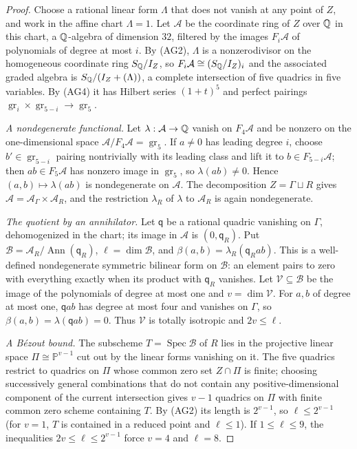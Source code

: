 \begin{proof}
Choose a rational linear form $\Lambda$ that does not vanish at any point of
$Z$, and work in the affine chart $\Lambda=1$. Let $\mathcal A$ be the
coordinate ring of $Z$ over $\mathbb Q$ in this chart, a $\mathbb Q$-algebra of dimension
$32$, filtered by the images $F_i\mathcal A$ of polynomials of degree at most
$i$. By (AG2), $\Lambda$ is a nonzerodivisor on the homogeneous coordinate ring
$S_\mathbb Q/I_Z$, so $F_i\mathcal A\cong(S_\mathbb Q/I_Z)_i$ and the associated graded algebra
is $S_\mathbb Q/(I_Z+(\Lambda))$, a complete intersection of five quadrics in five
variables. By (AG4) it has Hilbert series $(1+t)^5$ and perfect pairings
$\operatorname{gr}_i\times\operatorname{gr}_{5-i}\to\operatorname{gr}_5$.

\emph{A nondegenerate functional.} Let $\lambda:\mathcal A\to\mathbb Q$ vanish on
$F_4\mathcal A$ and be nonzero on the one-dimensional space
$\mathcal A/F_4\mathcal A=\operatorname{gr}_5$. If $a\ne0$ has leading degree
$i$, choose $b'\in\operatorname{gr}_{5-i}$ pairing nontrivially with its leading
class and lift it to $b\in F_{5-i}\mathcal A$; then $ab\in F_5\mathcal A$ has
nonzero image in $\operatorname{gr}_5$, so $\lambda(ab)\ne0$. Hence
$(a,b)\mapsto\lambda(ab)$ is nondegenerate on $\mathcal A$. The decomposition
$Z=\Gamma\sqcup R$ gives $\mathcal A=\mathcal A_\Gamma\times\mathcal A_R$, and
the restriction $\lambda_R$ of $\lambda$ to $\mathcal A_R$ is again
nondegenerate.

\emph{The quotient by an annihilator.} Let $\mathsf q$ be a rational quadric
vanishing on $\Gamma$, dehomogenized in the chart; its image in $\mathcal A$ is
$(0,\mathsf q_R)$. Put $\mathcal B=\mathcal A_R/\operatorname{Ann}(\mathsf q_R)$,
$\ell=\dim\mathcal B$, and $\beta(a,b)=\lambda_R(\mathsf q_Rab)$. This is a
well-defined nondegenerate symmetric bilinear form on $\mathcal B$: an element
pairs to zero with everything exactly when its product with $\mathsf q_R$
vanishes. Let $\mathcal V\subseteq\mathcal B$ be the image of the polynomials
of degree at most one and $v=\dim\mathcal V$. For $a,b$ of degree at most one,
$\mathsf qab$ has degree at most four and vanishes on $\Gamma$, so
$\beta(a,b)=\lambda(\mathsf qab)=0$. Thus $\mathcal V$ is totally isotropic
and $2v\le\ell$.

\emph{A B\'ezout bound.} The subscheme $T=\operatorname{Spec}\mathcal B$ of $R$
lies in the projective linear space $\Pi\cong\mathbb P^{v-1}$ cut out by the
linear forms vanishing on it. The five quadrics restrict to quadrics on $\Pi$
whose common zero set $Z\cap\Pi$ is finite; choosing successively general
combinations that do not contain any positive-dimensional component of the
current intersection gives $v-1$ quadrics on $\Pi$ with finite common zero
scheme containing $T$. By (AG2) its length is $2^{v-1}$, so
$\ell\le2^{v-1}$ (for $v=1$, $T$ is contained in a reduced point and
$\ell\le1$). If $1\le\ell\le9$, the inequalities $2v\le\ell\le2^{v-1}$ force
$v=4$ and $\ell=8$.


\end{proof}
